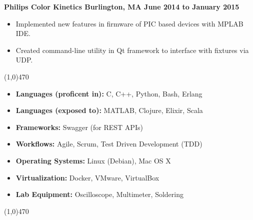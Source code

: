 \documentclass[11pt, a4paper]{article} %
\newcommand{\tinybullet}{ {\tiny \textbullet} }
\begin{document}
\centerline{\bf Philips Color Kinetics \tinybullet \hspace{1pt} Burlington, MA \hfill June 2014 to January 2015}
\begin{itemize}
\itemsep0em
	\item Implemented new features in firmware of PIC based devices with MPLAB IDE.
	\item Created command-line utility in Qt framework to interface with fixtures via UDP.
\end{itemize}

\noindent \line(1,0){470}\\

\vspace{5pt}
\begin{itemize}
\itemsep0em
	\item {\bf Languages (proficent in):} C, C++, Python, Bash, Erlang
	\item {\bf Languages (exposed to):} MATLAB, Clojure, Elixir, Scala
	\item {\bf Frameworks:} Swagger (for REST APIs)
	\item {\bf Workflows:} Agile, Scrum, Test Driven Development (TDD)
	\item {\bf Operating Systems:} Linux (Debian), Mac OS X
	\item {\bf Virtualization:} Docker, VMware, VirtualBox
	\item {\bf Lab Equipment:} Oscilloscope, Multimeter, Soldering
\end{itemize}

\vfill
\noindent \line(1,0){470} \\
\end{document}

